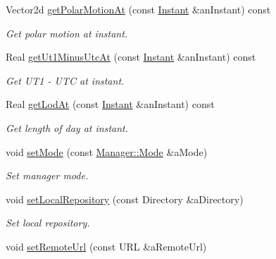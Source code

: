 \begin{DoxyCompactItemize}
Vector2d \hyperlink{classostk_1_1physics_1_1coord_1_1frame_1_1provider_1_1iers_1_1_manager_a2e2fb0b741c41e8936f1ed20d7b2b873}{get\+Polar\+Motion\+At} (const \hyperlink{classostk_1_1physics_1_1time_1_1_instant}{Instant} \&an\+Instant) const
\begin{DoxyCompactList}\small\item\em Get polar motion at instant. \end{DoxyCompactList}\item 
Real \hyperlink{classostk_1_1physics_1_1coord_1_1frame_1_1provider_1_1iers_1_1_manager_ac0670e062b624d5b1881a820275bb906}{get\+Ut1\+Minus\+Utc\+At} (const \hyperlink{classostk_1_1physics_1_1time_1_1_instant}{Instant} \&an\+Instant) const
\begin{DoxyCompactList}\small\item\em Get U\+T1 -\/ U\+TC at instant. \end{DoxyCompactList}\item 
Real \hyperlink{classostk_1_1physics_1_1coord_1_1frame_1_1provider_1_1iers_1_1_manager_aa533ea91c79df156cd2904c63a58df34}{get\+Lod\+At} (const \hyperlink{classostk_1_1physics_1_1time_1_1_instant}{Instant} \&an\+Instant) const
\begin{DoxyCompactList}\small\item\em Get length of day at instant. \end{DoxyCompactList}\item 
void \hyperlink{classostk_1_1physics_1_1coord_1_1frame_1_1provider_1_1iers_1_1_manager_a6a43ef4397efc074f02d2dbcce01e3f9}{set\+Mode} (const \hyperlink{classostk_1_1physics_1_1coord_1_1frame_1_1provider_1_1iers_1_1_manager_a3a8dd1081d1094069417687b4a3f16ba}{Manager\+::\+Mode} \&a\+Mode)
\begin{DoxyCompactList}\small\item\em Set manager mode. \end{DoxyCompactList}\item 
void \hyperlink{classostk_1_1physics_1_1coord_1_1frame_1_1provider_1_1iers_1_1_manager_abf2cc0416dae265af7d249526bb8f73d}{set\+Local\+Repository} (const Directory \&a\+Directory)
\begin{DoxyCompactList}\small\item\em Set local repository. \end{DoxyCompactList}\item 
void \hyperlink{classostk_1_1physics_1_1coord_1_1frame_1_1provider_1_1iers_1_1_manager_a4beb69ab9704ee45f06ec5cdf3df4dde}{set\+Remote\+Url} (const U\+RL \&a\+Remote\+Url)

\end{DoxyCompactItemize}
